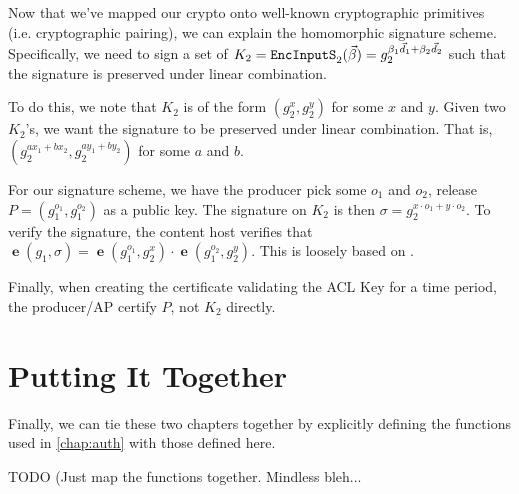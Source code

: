\documentclass[pdftex,12pt,a4papaer,twoside,notitlepage]{report}
\DeclareMathOperator{\e}{\mathbf{e}}
\DeclareMathOperator{\eins}{\mathtt{EncInputS}}
\begin{document}
Now that we've mapped our crypto onto well-known cryptographic primitives (i.e.
cryptographic pairing), we can explain the homomorphic signature scheme.
Specifically, we need to sign a set of $K_2 = \eins_2(\Bp) =
g_2^{\beta_1\vec{d}_1 + \beta_2\vec{d}_2}$ such that the signature is preserved
under linear combination.

To do this, we note that $K_2$ is of the form $(g_2^x, g_2^y)$ for some $x$
and $y$. Given two $K_2$'s, we want the signature to be preserved under linear
combination. That is, $(g_2^{ax_1 + bx_2}, g_2^{ay_1 + by_2})$ for some $a$ and $b$.

For our signature scheme, we have the producer pick some $o_1$ and $o_2$,
release $P = (g_1^{o_1}, g_1^{o_2})$ as a public key. The signature on $K_2$ is then
$\sigma = g_2^{x\cdot o_1 + y\cdot o_2}$. To verify the signature, the content host
verifies that $\e(g_1, \sigma) = \e(g_1^{o_1}, g_2^x) \cdot \e(g_1^{o_2},
g_2^y)$. This is loosely based on \cite{signature}.

Finally, when creating the certificate validating the ACL Key for a time period,
the producer/AP certify $P$, not $K_2$ directly.

\section{Putting It Together}

Finally, we can tie these two chapters together by explicitly defining the
functions used in \cref{chap:auth} with those defined here.

TODO (Just map the functions together. Mindless bleh...
\end{document}
